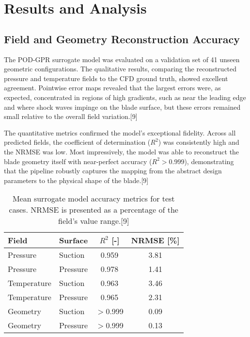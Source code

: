 \documentclass[12pt, a4paper]{report}
\begin{document}
\section{Results and Analysis}

\subsection{Field and Geometry Reconstruction Accuracy}
The POD-GPR surrogate model was evaluated on a validation set of 41 unseen geometric configurations. The qualitative results, comparing the reconstructed pressure and temperature fields to the CFD ground truth, showed excellent agreement. Pointwise error maps revealed that the largest errors were, as expected, concentrated in regions of high gradients, such as near the leading edge and where shock waves impinge on the blade surface, but these errors remained small relative to the overall field variation.[9]

The quantitative metrics confirmed the model's exceptional fidelity. Across all predicted fields, the coefficient of determination ($R^2$) was consistently high and the NRMSE was low. Most impressively, the model was able to reconstruct the blade geometry itself with near-perfect accuracy ($R^2 > 0.999$), demonstrating that the pipeline robustly captures the mapping from the abstract design parameters to the physical shape of the blade.[9]

\begin{table}[htbp]
\centering
\caption{Mean surrogate model accuracy metrics for test cases. NRMSE is presented as a percentage of the field's value range.[9]}
\label{tab:rotor_accuracy}
\begin{tabular}{@{}llcc@{}}
\toprule
Field & Surface & $R^2$ [-] & NRMSE [\%] \\
\midrule
Pressure & Suction & 0.959 & 3.81 \\
Pressure & Pressure & 0.978 & 1.41 \\
Temperature & Suction & 0.963 & 3.46 \\
Temperature & Pressure & 0.965 & 2.31 \\
Geometry & Suction & $>$0.999 & 0.09 \\
Geometry & Pressure & $>$0.999 & 0.13 \\
\bottomrule
\end{tabular}
\end{table}
\end{document}
